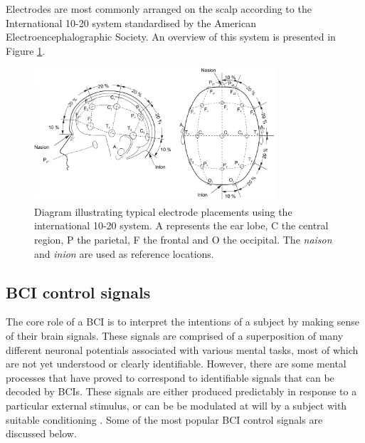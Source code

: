 Electrodes are most commonly arranged on the scalp according to the International 10-20 system standardised by the American Electroencephalographic Society. An overview of this system is presented in Figure \ref{fig:10-20-positions}.

\begin{figure}[h]
    \centering
    \includegraphics[width=0.8\textwidth]{10-20-electrode.png}
    \caption[Electrode positions according to the 10-20 system]{Diagram illustrating typical electrode placements using the international 10-20 system. A represents the ear lobe, C the central region, P the parietal, F the frontal and O the occipital. The \textit{naison} and \textit{inion} are used as reference locations.}
    \label{fig:10-20-positions}
\end{figure}

\subsection{BCI control signals}
The core role of a BCI is to interpret the intentions of a subject by making sense of their brain signals. These signals are comprised of a superposition of many different neuronal potentials associated with various mental tasks, most of which are not yet understood or clearly identifiable. However, there are some mental processes that have proved to correspond to identifiable signals that can be decoded by BCIs. These signals are either produced predictably in response to a particular external stimulus, or can be be modulated at will by a subject with suitable conditioning \cite{bci-survey-nicolas-alonso}. Some of the most popular BCI control signals are discussed below.

